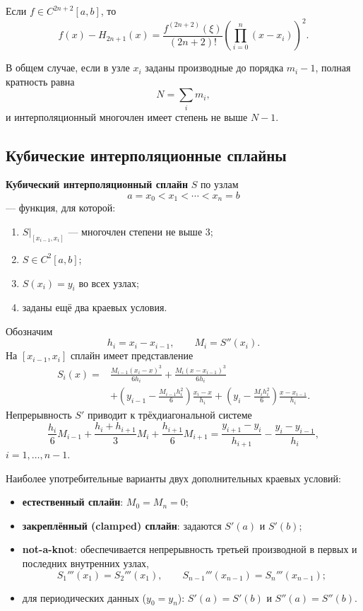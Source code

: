 Если $f\in C^{2n+2}[a,b]$, то
\[
\boxed{
f(x)-H_{2n+1}(x)
=
\frac{f^{(2n+2)}(\xi)}{(2n+2)!}
\left(\prod_{i=0}^{n}(x-x_i)\right)^2.
}
\]

В общем случае, если в узле $x_i$ заданы производные до порядка $m_i-1$, полная кратность равна
\[
N=\sum_i m_i,
\]
и интерполяционный многочлен имеет степень не выше $N-1$.

\subsection{Кубические интерполяционные сплайны}

\textbf{Кубический интерполяционный сплайн} $S$ по узлам
\[
a=x_0<x_1<\cdots<x_n=b
\]
--- функция, для которой:
\begin{enumerate}
\item $S|_{[x_{i-1},x_i]}$ --- многочлен степени не выше $3$;
\item $S\in C^2[a,b]$;
\item $S(x_i)=y_i$ во всех узлах;
\item заданы ещё два краевых условия.
\end{enumerate}

Обозначим
\[
h_i=x_i-x_{i-1},
\qquad M_i=S''(x_i).
\]
На $[x_{i-1},x_i]$ сплайн имеет представление
\[
\begin{split}
S_i(x)=&\frac{M_{i-1}(x_i-x)^3}{6h_i}
+\frac{M_i(x-x_{i-1})^3}{6h_i}\\
&+\left(y_{i-1}-\frac{M_{i-1}h_i^2}{6}\right)\frac{x_i-x}{h_i}
+\left(y_i-\frac{M_ih_i^2}{6}\right)\frac{x-x_{i-1}}{h_i}.
\end{split}
\]
Непрерывность $S'$ приводит к трёхдиагональной системе
\[
\boxed{
\frac{h_i}{6}M_{i-1}
+\frac{h_i+h_{i+1}}{3}M_i
+\frac{h_{i+1}}{6}M_{i+1}
=
\frac{y_{i+1}-y_i}{h_{i+1}}
-
\frac{y_i-y_{i-1}}{h_i},
}
\]
$i=1,\ldots,n-1$.

Наиболее употребительные варианты двух дополнительных краевых условий:
\begin{itemize}
\item \textbf{естественный сплайн}: $M_0=M_n=0$;
\item \textbf{закреплённый (clamped) сплайн}: задаются $S'(a)$ и $S'(b)$;
\item \textbf{not-a-knot}: обеспечивается непрерывность третьей производной в первых и последних внутренних узлах,
\[
S_1'''(x_1)=S_2'''(x_1),
\qquad
S_{n-1}'''(x_{n-1})=S_n'''(x_{n-1});
\]
\item для периодических данных ($y_0=y_n$): $S'(a)=S'(b)$ и $S''(a)=S''(b)$.
\end{itemize}

